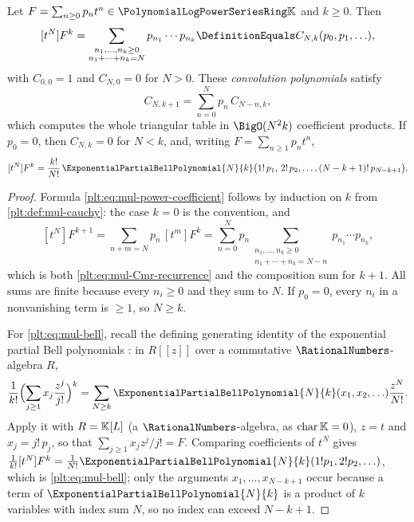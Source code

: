 \begin{proposition}
\label{plt:prop:mul-integer-power}
Let $F=\sum_{n\ge0}p_nt^n\in\PLpow$ and $k\ge0$.  Then
\begin{equation}\label{plt:eq:mul-power-coefficient}
 [t^N]F^k
 =\sum_{\substack{n_1,\ldots,n_k\ge0\\ n_1+\cdots+n_k=N}}
   p_{n_1}\cdots p_{n_k}
 \DefinitionEquals C_{N,k}(p_0,p_1,\ldots),
\end{equation}
with $C_{0,0}=1$ and $C_{N,0}=0$ for $N>0$.  These \emph{convolution
polynomials} satisfy
\begin{equation}\label{plt:eq:mul-Cmr-recurrence}
 C_{N,k+1}=\sum_{n=0}^{N}p_n\,C_{N-n,k},
\end{equation}
which computes the whole triangular table in $\BigO(N^2k)$ coefficient
products.  If $p_0=0$, then $C_{N,k}=0$ for $N<k$, and, writing
$F=\sum_{n\ge1}p_nt^n$,
\begin{equation}\label{plt:eq:mul-bell}
 [t^N]F^k
 =\frac{k!}{N!}\,
 \ExponentialPartialBellPolynomial{N}{k}
   \bigl(1!\,p_1,\,2!\,p_2,\ldots,(N-k+1)!\,p_{N-k+1}\bigr).
\end{equation}
\end{proposition}

\begin{proof}
Formula \eqref{plt:eq:mul-power-coefficient} follows by induction on $k$ from
\cref{plt:def:mul-cauchy}: the case $k=0$ is the convention, and
\[
 [t^N]F^{k+1}=\sum_{n+m=N}p_n\,[t^m]F^k
 =\sum_{n=0}^{N}p_n\!\!\!\!\sum_{\substack{n_1,\ldots,n_k\ge0\\
   n_1+\cdots+n_k=N-n}}\!\!\!\!
   p_{n_1}\cdots p_{n_k},
\]
which is both \eqref{plt:eq:mul-Cmr-recurrence} and the composition sum for
$k+1$.  All sums are finite because every $n_i\ge0$ and they sum to $N$.  If
$p_0=0$, every $n_i$ in a nonvanishing term is $\ge1$, so $N\ge k$.

For \eqref{plt:eq:mul-bell}, recall the defining generating identity of the
exponential partial Bell polynomials \cite{comtet-book,comtet1970}: in
$R[[z]]$ over a commutative $\RationalNumbers$-algebra $R$,
\[
 \frac1{k!}\Bigl(\sum_{j\ge1}x_j\frac{z^j}{j!}\Bigr)^{k}
 =\sum_{N\ge k}\ExponentialPartialBellPolynomial{N}{k}(x_1,x_2,\ldots)
   \frac{z^N}{N!}.
\]
Apply it with $R=\mathbb{K}[L]$ (a $\RationalNumbers$-algebra, as
$\operatorname{char}\mathbb{K}=0$), $z=t$ and $x_j=j!\,p_j$, so that
$\sum_{j\ge1}x_jz^j/j!=F$.  Comparing coefficients of $t^N$ gives
$\frac1{k!}[t^N]F^k=\frac1{N!}
\ExponentialPartialBellPolynomial{N}{k}(1!p_1,2!p_2,\ldots)$, which is
\eqref{plt:eq:mul-bell}; only the arguments $x_1,\ldots,x_{N-k+1}$ occur
because a term of $\ExponentialPartialBellPolynomial{N}{k}$ is a product of
$k$ variables with index sum $N$, so no index can exceed $N-k+1$.
\end{proof}


